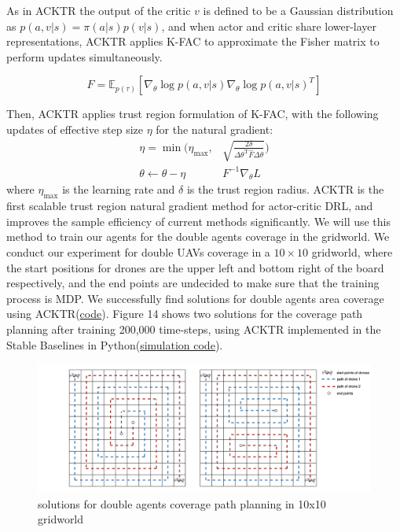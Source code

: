 \documentclass{article}
\begin{document}
As in ACKTR the output of the critic $v$ is defined to be a Gaussian distribution as $p(a, v | s)=\pi(a | s) p(v | s) $, and when actor and critic share lower-layer representations, ACKTR applies K-FAC to approximate the Fisher matrix to perform updates simultaneously.

\begin{equation}
F=\mathbb{E}_{p(\tau)}\left[\nabla_\theta \log p(a, v | s) \nabla_\theta \log p(a, v | s)^{T}\right]
\end{equation}

Then, ACKTR applies trust region formulation of K-FAC, with the following updates of effective step size $\eta$ for the natural gradient:
\begin{subequations}
    \begin{align}
        \eta=\min (\eta_{\max }, & \sqrt{\frac{2 \delta}{\Delta \theta^{\mathrm{T}} \hat{F} \Delta \theta}}) \\
         \theta \leftarrow \theta-\eta & F^{-1} \nabla_{\theta} L
    \end{align}
\end{subequations}
where $\eta_{\max }$ is the learning rate and $\delta$ is the trust region radius. ACKTR is the first scalable trust region natural gradient method for actor-critic DRL, and improves the sample efficiency of current methods significantly\cite{ACKTR}. We will use this method to train our agents for the double agents coverage in the gridworld. 
We conduct our experiment for double UAVs coverage in a $10\times10$ gridworld, where the start positions for drones are the upper left and bottom right of the board respectively, and the end points are undecided to make sure that the training process is MDP. We successfully find solutions for double agents area coverage using ACKTR(\href{https://github.com/zcczhang/UAV_Coverage/tree/master/ACTKR_double_Coverage}{code}). Figure 14 shows two solutions for the coverage path planning after training 200,000 time-steps, using ACKTR implemented in the Stable Baselines in Python(\href{https://github.com/zcczhang/UAV_Coverage/tree/master/Simulation}{simulation code}).

\begin{figure}[H]
    \centering
    \includegraphics[width=\textwidth]{12.png}
    \caption{solutions for double agents coverage path planning in 10x10 gridworld}
\end{figure}
\end{document}
